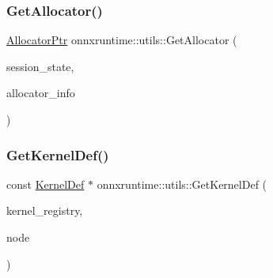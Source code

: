 \mbox{\label{namespaceonnxruntime_1_1utils_a1929d3a08af5b86f2040d95ea0f7a7ce}} 
\subsubsection{\texorpdfstring{Get\+Allocator()}{GetAllocator()}\hspace{0.1cm}{\footnotesize\ttfamily [2/2]}}
{\footnotesize\ttfamily \mbox{\hyperlink{namespaceonnxruntime_a6cdac724c5dcefded3a63f08dae58fda}{Allocator\+Ptr}} onnxruntime\+::utils\+::\+Get\+Allocator (\begin{DoxyParamCaption}\item[{const \mbox{\hyperlink{classonnxruntime_1_1SessionState}{Session\+State}} \&}]{session\+\_\+state,  }\item[{const \mbox{\hyperlink{structONNXRuntimeAllocatorInfo}{O\+N\+N\+X\+Runtime\+Allocator\+Info}} \&}]{allocator\+\_\+info }\end{DoxyParamCaption})}

\mbox{\label{namespaceonnxruntime_1_1utils_a7cc8827cc590f48e3cc3ef8eaa6c4f56}} 
\subsubsection{\texorpdfstring{Get\+Kernel\+Def()}{GetKernelDef()}\hspace{0.1cm}{\footnotesize\ttfamily [1/2]}}
{\footnotesize\ttfamily const \mbox{\hyperlink{classonnxruntime_1_1KernelDef}{Kernel\+Def}} $\ast$ onnxruntime\+::utils\+::\+Get\+Kernel\+Def (\begin{DoxyParamCaption}\item[{const \mbox{\hyperlink{classonnxruntime_1_1KernelRegistryManager}{Kernel\+Registry\+Manager}} \&}]{kernel\+\_\+registry,  }\item[{const \mbox{\hyperlink{classonnxruntime_1_1Node}{onnxruntime\+::\+Node}} \&}]{node }\end{DoxyParamCaption})}

\mbox{\label{namespaceonnxruntime_1_1utils_af84acbefafc1b22b24e6951e7050fe51}} 
